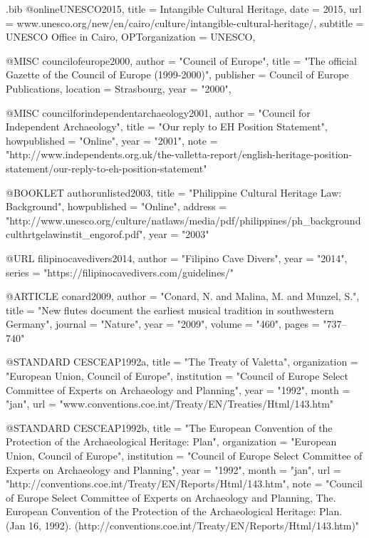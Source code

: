 \begin{filecontents}{\IJSRAidentifier.bib}
@online{UNESCO2015,
	title = {Intangible Cultural Heritage},
	date = {2015},
	url = {www.unesco.org/new/en/cairo/culture/intangible-cultural-heritage/},
	subtitle = {UNESCO Office in Cairo},
	OPTorganization = {UNESCO},
}

@MISC {councilofeurope2000,
author = "Council of Europe",
title  = "The official Gazette of the Council of Europe (1999-2000)",
publisher = {Council of Europe Publications},
location = {Strasbourg},
year   = "2000",
}

@MISC {councilforindependentarchaeology2001,
author       = "Council for Independent Archaeology",
title        = "Our reply to EH Position Statement",
howpublished = "Online",
year         = "2001",
note         = "http://www.independents.org.uk/the-valletta-report/english-heritage-position-statement/our-reply-to-eh-position-statement"
}

@BOOKLET {authorunlisted2003,
title        = "Philippine Cultural Heritage Law: Background",
howpublished = "Online",
address      = "http://www.unesco.org/culture/natlaws/media/pdf/philippines/ph_backgroundculthrtgelawinstit_engorof.pdf",
year         = "2003"
}

@URL {filipinocavedivers2014,
author = "Filipino Cave Divers",
year   = "2014",
series = "https://filipinocavedivers.com/guidelines/"
}

@ARTICLE {conard2009,
author  = "Conard, N. and Malina, M. and Munzel, S.",
title   = "New flutes document the earliest musical tradition in southwestern Germany",
journal = "Nature",
year    = "2009",
volume  = "460",
pages   = "737--740"
}

@STANDARD {CESCEAP1992a,
title        = "The Treaty of Valetta",
organization = "European Union, Council of Europe",
institution  = "Council of Europe Select Committee of Experts on Archaeology and Planning",
year         = "1992",
month        = "jan",
url          = "www.conventions.coe.int/Treaty/EN/Treaties/Html/143.htm"
}

@STANDARD {CESCEAP1992b,
title        = "The European Convention of the Protection of the Archaeological Heritage: Plan",
organization = "European Union, Council of Europe",
institution  = "Council of Europe Select Committee of Experts on Archaeology and Planning",
year         = "1992",
month        = "jan",
url          = "http://conventions.coe.int/Treaty/EN/Reports/Html/143.htm",
note         = "Council of Europe Select Committee of Experts on Archaeology and Planning, The. European Convention of the Protection of the Archaeological Heritage: Plan. (Jan 16, 1992). (http://conventions.coe.int/Treaty/EN/Reports/Html/143.htm)"
}


\end{filecontents}

